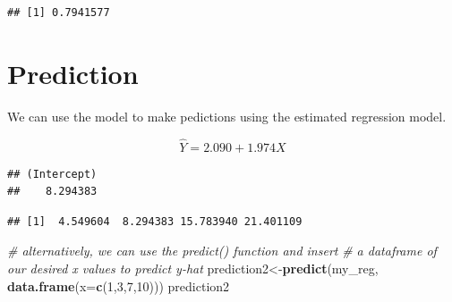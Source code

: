 \documentclass[]{book}
\newenvironment{Shaded}{\begin{snugshade}}{\end{snugshade}}
\newcommand{\KeywordTok}[1]{\textcolor[rgb]{0.13,0.29,0.53}{\textbf{#1}}}
\newcommand{\DataTypeTok}[1]{\textcolor[rgb]{0.13,0.29,0.53}{#1}}
\newcommand{\DecValTok}[1]{\textcolor[rgb]{0.00,0.00,0.81}{#1}}
\newcommand{\CommentTok}[1]{\textcolor[rgb]{0.56,0.35,0.01}{\textit{#1}}}
\newcommand{\OperatorTok}[1]{\textcolor[rgb]{0.81,0.36,0.00}{\textbf{#1}}}
\newcommand{\NormalTok}[1]{#1}
\theoremstyle{definition}
\theoremstyle{definition}
\theoremstyle{definition}
\theoremstyle{remark}
\begin{document}
\begin{verbatim}
## [1] 0.7941577
\end{verbatim}

\section{Prediction}\label{prediction}

We can use the model to make pedictions using the estimated regression
model.

\[\hat{Y}=2.090+1.974X\]

\begin{Shaded}
\end{Shaded}

\begin{verbatim}
## (Intercept) 
##    8.294383
\end{verbatim}

\begin{Shaded}
\end{Shaded}

\begin{verbatim}
## [1]  4.549604  8.294383 15.783940 21.401109
\end{verbatim}

\begin{Shaded}
\begin{Highlighting}[]
\CommentTok{# alternatively, we can use the predict() function and insert }
\CommentTok{# a dataframe of our desired x values to predict y-hat}
\NormalTok{prediction2<-}\KeywordTok{predict}\NormalTok{(my_reg, }\KeywordTok{data.frame}\NormalTok{(}\DataTypeTok{x=}\KeywordTok{c}\NormalTok{(}\DecValTok{1}\NormalTok{,}\DecValTok{3}\NormalTok{,}\DecValTok{7}\NormalTok{,}\DecValTok{10}\NormalTok{)))}
\NormalTok{prediction2}
\end{Highlighting}
\end{Shaded}
\end{document}
